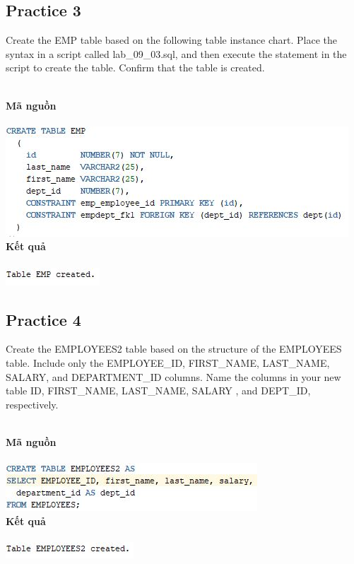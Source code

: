 \documentclass[12pt,a4paper]{report}
\begin{document}
\subsection{Practice 3}
\begin{boxedminipage}[t]{15.5cm}
	Create the EMP table based on the following table instance chart. Place the syntax in a script called lab\_09\_03.sql, and then execute the statement in the script to create the table. Confirm that the table is created.
\end{boxedminipage}
\newline
\\
\textbf{Mã nguồn}\\\\
\includegraphics[scale=1]{p3.jpg}\\
\textbf{Kết quả}\\\\
\includegraphics[scale=1]{kp3.jpg}

\subsection{Practice 4}
\begin{boxedminipage}[t]{15.5cm}
	Create the EMPLOYEES2 table based on the structure of the EMPLOYEES table. Include only the EMPLOYEE\_ID, FIRST\_NAME, LAST\_NAME, SALARY, and DEPARTMENT\_ID columns. Name the columns in your new table ID, FIRST\_NAME, LAST\_NAME, SALARY , and DEPT\_ID, respectively.
\end{boxedminipage}
\newline
\\
\textbf{Mã nguồn}\\\\
\includegraphics[scale=1]{p4.jpg}\\
\textbf{Kết quả}\\\\
\includegraphics[scale=1]{kp4.jpg}
\end{document}
